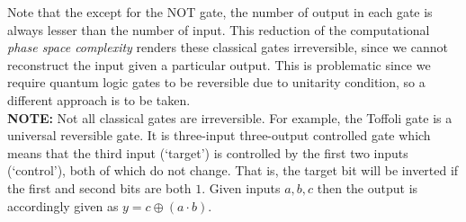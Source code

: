 Note that the except for the NOT gate, the number of output in each gate is always lesser than the number of input. This reduction of the computational \textit{phase space complexity} renders these classical gates irreversible, since we cannot reconstruct the input given a particular output. This is problematic since we require quantum logic gates to be reversible due to unitarity condition, so a different approach is to be taken.\\[0.2cm]
\textbf{NOTE:} Not all classical gates are irreversible. For example, the Toffoli gate is a universal reversible gate. It is three-input three-output controlled gate which means that the third input (`target') is controlled by the first two inputs (`control'), both of which do not change. That is, the target bit will be inverted if the first and second bits are both $1$. Given inputs $a,b,c$ then the output is accordingly given as $y=c\oplus (a\cdot b)$.

